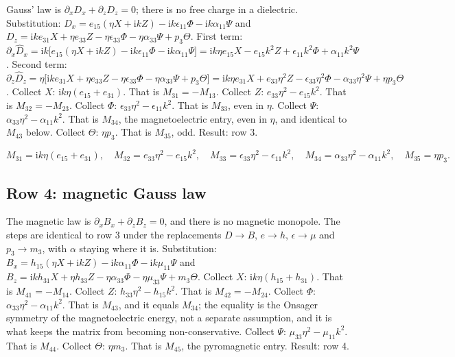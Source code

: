 \documentclass[11pt]{article}
\makeatletter
\newif\ifshowworked
\newenvironment{worked}{%
  \ifshowworked\par\smallskip\noindent\textit{Working.}\par\smallskip\else
  \setbox\z@\vbox\bgroup\fi}{\ifshowworked\par\smallskip\else\egroup\fi}
\newcommand{\ii}{\mathrm{i}}
\makeatother
\begin{document}
\begin{worked}
Gauss' law is $\partial_xD_x+\partial_zD_z=0$; there is no free charge in a dielectric.
Substitution: $D_x=e_{15}(\eta X+\ii kZ)-\ii k\epsilon_{11}\Phi-\ii k\alpha_{11}\Psi$ and
$D_z=\ii ke_{31}X+\eta e_{33}Z-\eta\epsilon_{33}\Phi-\eta\alpha_{33}\Psi+p_3\Theta$.
First term: $\partial_x\hat D_x=\ii k\bigl[e_{15}(\eta X+\ii kZ)-\ii k\epsilon_{11}\Phi
-\ii k\alpha_{11}\Psi\bigr]=\ii k\eta e_{15}X-e_{15}k^2Z+\epsilon_{11}k^2\Phi+\alpha_{11}k^2\Psi$.
Second term: $\partial_z\hat D_z=\eta\bigl[\ii ke_{31}X+\eta e_{33}Z-\eta\epsilon_{33}\Phi
-\eta\alpha_{33}\Psi+p_3\Theta\bigr]
=\ii k\eta e_{31}X+e_{33}\eta^2Z-\epsilon_{33}\eta^2\Phi-\alpha_{33}\eta^2\Psi+\eta p_3\Theta$.
Collect $X$: $\ii k\eta(e_{15}+e_{31})$. That is $M_{31}=-M_{13}$.
Collect $Z$: $e_{33}\eta^2-e_{15}k^2$. That is $M_{32}=-M_{23}$.
Collect $\Phi$: $\epsilon_{33}\eta^2-\epsilon_{11}k^2$. That is $M_{33}$, even in $\eta$.
Collect $\Psi$: $\alpha_{33}\eta^2-\alpha_{11}k^2$. That is $M_{34}$, the magnetoelectric entry, even in
$\eta$, and identical to $M_{43}$ below.
Collect $\Theta$: $\eta p_3$. That is $M_{35}$, odd.
Result: row 3.
\end{worked}

\begin{equation}
M_{31}=\ii k\eta(e_{15}+e_{31}),\quad
M_{32}=e_{33}\eta^2-e_{15}k^2,\quad
M_{33}=\epsilon_{33}\eta^2-\epsilon_{11}k^2,\quad
M_{34}=\alpha_{33}\eta^2-\alpha_{11}k^2,\quad
M_{35}=\eta p_3 .
\end{equation}

\subsection*{Row 4: magnetic Gauss law}

\begin{worked}
The magnetic law is $\partial_xB_x+\partial_zB_z=0$, and there is no magnetic monopole. The steps are
identical to row 3 under the replacements $D\to B$, $e\to h$, $\epsilon\to\mu$ and $p_3\to m_3$, with
$\alpha$ staying where it is. Substitution:
$B_x=h_{15}(\eta X+\ii kZ)-\ii k\alpha_{11}\Phi-\ii k\mu_{11}\Psi$ and
$B_z=\ii kh_{31}X+\eta h_{33}Z-\eta\alpha_{33}\Phi-\eta\mu_{33}\Psi+m_3\Theta$.
Collect $X$: $\ii k\eta(h_{15}+h_{31})$. That is $M_{41}=-M_{14}$.
Collect $Z$: $h_{33}\eta^2-h_{15}k^2$. That is $M_{42}=-M_{24}$.
Collect $\Phi$: $\alpha_{33}\eta^2-\alpha_{11}k^2$. That is $M_{43}$, and it equals $M_{34}$; the equality
is the Onsager symmetry of the magnetoelectric energy, not a separate assumption, and it is what keeps
the matrix from becoming non-conservative.
Collect $\Psi$: $\mu_{33}\eta^2-\mu_{11}k^2$. That is $M_{44}$.
Collect $\Theta$: $\eta m_3$. That is $M_{45}$, the pyromagnetic entry.
Result: row 4.
\end{worked}
\end{document}
